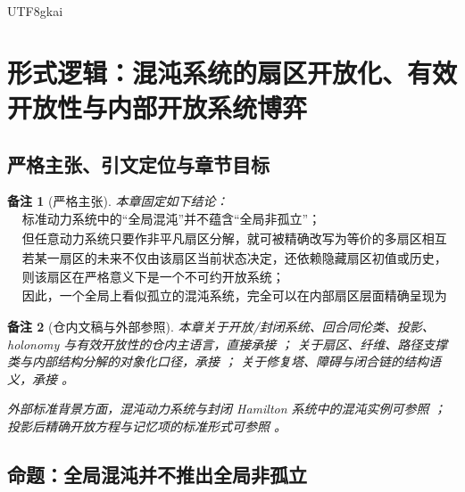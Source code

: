 \documentclass[12pt]{article}
\newtheorem{remark}{备注}[section]
\begin{document}
\begin{CJK*}{UTF8}{gkai}
\section{形式逻辑：混沌系统的扇区开放化、有效开放性与内部开放系统博弈}
\label{sec:tex43-ch3}

\subsection{严格主张、引文定位与章节目标}
\label{subsec:tex43-ch3-convention}

\begin{remark}[严格主张]
本章固定如下结论：
\[
  \boxed{
    \begin{aligned}
      &\text{标准动力系统中的“全局混沌”并不蕴含“全局非孤立”；}\\
      &\text{但任意动力系统只要作非平凡扇区分解，就可被精确改写为等价的多扇区相互影响系统；}\\
      &\text{若某一扇区的未来不仅由该扇区当前状态决定，还依赖隐藏扇区初值或历史，}\\
      &\text{则该扇区在严格意义下是一个不可约开放系统；}\\
      &\text{因此，一个全局上看似孤立的混沌系统，完全可以在内部扇区层面精确呈现为开放系统博弈。}
    \end{aligned}
  }
\]
\end{remark}

\begin{remark}[仓内文稿与外部参照]
本章关于开放/封闭系统、回合同伦类、投影、holonomy 与有效开放性的仓内主语言，直接承接
\cite{RepoTex23OpenSystemGame,RepoTex39StatRepair}；
关于扇区、纤维、路径支撑类与内部结构分解的对象化口径，承接
\cite{RepoTex36HomotopyTwistBijection}；
关于修复塔、障碍与闭合链的结构语义，承接
\cite{RepoTex38JacobiBianchiRepair,RepoTex29RepairableObstruction,RepoTex27PowerdomainFiberExtension}。

外部标准背景方面，混沌动力系统与封闭 Hamilton 系统中的混沌实例可参照
\cite{KatokHasselblatt1995,Ott2002Chaos}；
投影后精确开放方程与记忆项的标准形式可参照
\cite{Zwanzig2001Nonequilibrium}。
\end{remark}

\subsection{命题：全局混沌并不推出全局非孤立}
\label{subsec:tex43-ch3-boundary}


\end{CJK*}
\end{document}
